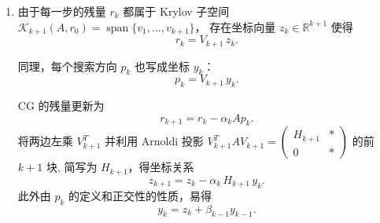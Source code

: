 \documentclass{ctexart}
\begin{document}
\begin{solution}
\begin{enumerate}

    \item  由于每一步的残量 \(r_k\) 都属于 Krylov 子空间 \(\mathcal K_{k+1}(A,r_0)=\operatorname{span}\{v_1,\dots,v_{k+1}\}\)，
      存在坐标向量 \(z_k\in\mathbb R^{k+1}\) 使得
      \[
        r_k = V_{k+1}\, z_k.
      \]

      同理，每个搜索方向 \(p_k\) 也写成坐标 \(y_k\)：
      \[
        p_k = V_{k+1}\, y_k.
      \]

      CG 的残量更新为
      \[
        r_{k+1} = r_k - \alpha_k A p_k.
      \]
      将两边左乘 \(V_{k+1}^T\)
      并利用 Arnoldi 投影 \(V_{k+1}^T A V_{k+1} =
        \begin{pmatrix} H_{k+1} & * \\ 0 & *
      \end{pmatrix}\) 的前 \(k+1\) 块, 简写为 \(H_{k+1}\)，得坐标关系
      \[
        z_{k+1} = z_k - \alpha_k\, H_{k+1}\, y_k.
      \]
      此外由 \(p_k\) 的定义和正交性的性质，易得
      \[
        y_k = z_k + \beta_{k-1} y_{k-1}.
        \tag{2}
      \]


\end{enumerate}
\end{solution}
\end{document}
